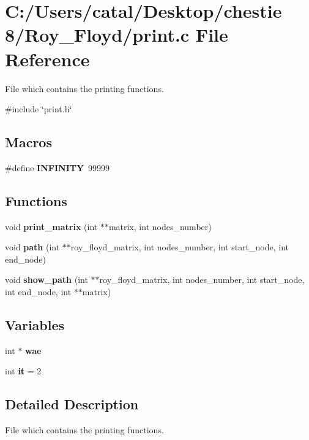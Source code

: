 \section{C\+:/\+Users/catal/\+Desktop/chestie 8/\+Roy\+\_\+\+Floyd/print.c File Reference}
\label{print_8c}


File which contains the printing functions.  


{\ttfamily \#include \char`\"{}print.\+h\char`\"{}}\newline
\subsection*{Macros}
\begin{DoxyCompactItemize}
\item 
\#define \textbf{ I\+N\+F\+I\+N\+I\+TY}~99999
\end{DoxyCompactItemize}
\subsection*{Functions}
\begin{DoxyCompactItemize}
\item 
void \textbf{ print\+\_\+matrix} (int $\ast$$\ast$matrix, int nodes\+\_\+number)
\item 
void \textbf{ path} (int $\ast$$\ast$roy\+\_\+floyd\+\_\+matrix, int nodes\+\_\+number, int start\+\_\+node, int end\+\_\+node)
\item 
void \textbf{ show\+\_\+path} (int $\ast$$\ast$roy\+\_\+floyd\+\_\+matrix, int nodes\+\_\+number, int start\+\_\+node, int end\+\_\+node, int $\ast$$\ast$matrix)
\end{DoxyCompactItemize}
\subsection*{Variables}
\begin{DoxyCompactItemize}
\item 
int $\ast$ \textbf{ wae}
\item 
int \textbf{ it} = 2
\end{DoxyCompactItemize}


\subsection{Detailed Description}
File which contains the printing functions. 

